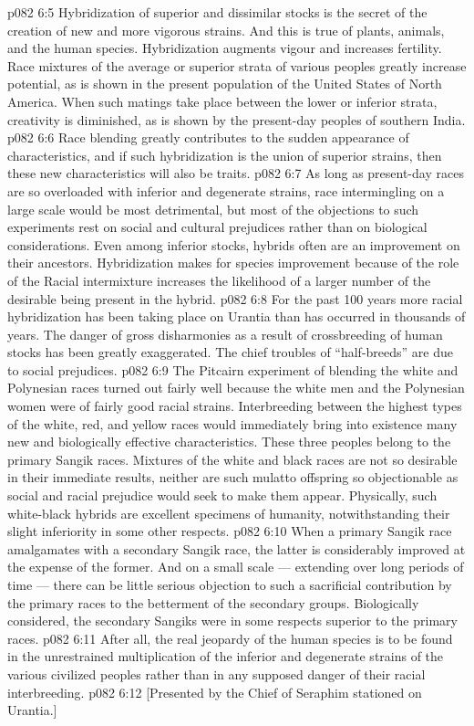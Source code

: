 \vs p082 6:5 Hybridization of superior and dissimilar stocks is the secret of the creation of new and more vigorous strains. And this is true of plants, animals, and the human species. Hybridization augments vigour and increases fertility. Race mixtures of the average or superior strata of various peoples greatly increase  potential, as is shown in the present population of the United States of North America. When such matings take place between the lower or inferior strata, creativity is diminished, as is shown by the present\hyp{}day peoples of southern India.
\vs p082 6:6 Race blending greatly contributes to the sudden appearance of  characteristics, and if such hybridization is the union of superior strains, then these new characteristics will also be  traits.
\vs p082 6:7 As long as present\hyp{}day races are so overloaded with inferior and degenerate strains, race intermingling on a large scale would be most detrimental, but most of the objections to such experiments rest on social and cultural prejudices rather than on biological considerations. Even among inferior stocks, hybrids often are an improvement on their ancestors. Hybridization makes for species improvement because of the role of the  Racial intermixture increases the likelihood of a larger number of the desirable  being present in the hybrid.
\vs p082 6:8 \pc For the past 100 years more racial hybridization has been taking place on Urantia than has occurred in thousands of years. The danger of gross disharmonies as a result of crossbreeding of human stocks has been greatly exaggerated. The chief troubles of “half\hyp{}breeds” are due to social prejudices.
\vs p082 6:9 The Pitcairn experiment of blending the white and Polynesian races turned out fairly well because the white men and the Polynesian women were of fairly good racial strains. Interbreeding between the highest types of the white, red, and yellow races would immediately bring into existence many new and biologically effective characteristics. These three peoples belong to the primary Sangik races. Mixtures of the white and black races are not so desirable in their immediate results, neither are such mulatto offspring so objectionable as social and racial prejudice would seek to make them appear. Physically, such white\hyp{}black hybrids are excellent specimens of humanity, notwithstanding their slight inferiority in some other respects.
\vs p082 6:10 \pc When a primary Sangik race amalgamates with a secondary Sangik race, the latter is considerably improved at the expense of the former. And on a small scale --- extending over long periods of time --- there can be little serious objection to such a sacrificial contribution by the primary races to the betterment of the secondary groups. Biologically considered, the secondary Sangiks were in some respects superior to the primary races.
\vs p082 6:11 After all, the real jeopardy of the human species is to be found in the unrestrained multiplication of the inferior and degenerate strains of the various civilized peoples rather than in any supposed danger of their racial interbreeding.
\vsetoff
\vs p082 6:12 [Presented by the Chief of Seraphim stationed on Urantia.]

